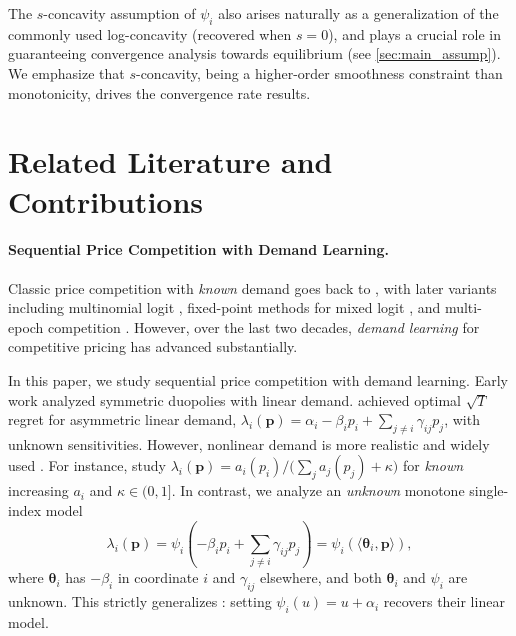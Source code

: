 \documentclass{article} %
\begin{document}
The $s$-concavity assumption of $\psi_i$ also arises naturally as a generalization of the commonly used log-concavity (recovered when $s=0$), and plays a crucial role in guaranteeing convergence analysis towards equilibrium (see \cref{sec:main_assump}). We emphasize that $s$-concavity, being a higher-order smoothness constraint than monotonicity, drives the convergence rate results.


\section{Related Literature and Contributions}\label{sec:Related-Literature}

\paragraph{Sequential Price Competition with Demand Learning.}

Classic price competition with \emph{known} demand goes back to \cite{cournot1838recherches, bertrand1883review}, with later variants including multinomial logit \citep{gallego2006price, aksoy2013price, gallego2014multiproduct}, fixed-point methods for mixed logit \citep{morrow2011fixed}, and multi-epoch competition \citep{gallego2014dynamic,federgruen2015multi, chen2021duopoly}. However, over the last two decades, \emph{demand learning} for competitive pricing has advanced substantially.

In this paper, we study sequential price competition with demand learning. Early work \citep{kirman1975learning} analyzed symmetric duopolies with linear demand. \cite{li2024lego} achieved optimal $\sqrt{T}$ regret for asymmetric linear demand, $\lambda_i(\mathbf p)=\alpha_i-\beta_i p_i+\sum_{j\ne i}\gamma_{ij}p_j$, with unknown sensitivities. However, nonlinear demand is more realistic and widely used \citep{gallego2006price, wan2022nonlinear, wan2023conditions}. For instance, \cite{gallego2006price} study $\lambda_i(\mathbf p)= a_i(p_i) / \big(\sum_j a_j(p_j)+\kappa\big)$ for \emph{known} increasing $a_i$ and $\kappa\in(0,1]$. In contrast, we analyze an \emph{unknown} monotone single-index model
\begin{equation}\label{eq:SIM}
\textstyle \lambda_i(\mathbf p)
=\psi_i(-\beta_i p_i+\sum_{j\ne i}\gamma_{ij}p_j)
=\psi_i\!\left(\langle\boldsymbol\theta_i,\mathbf p\rangle\right),
\end{equation}
where $\boldsymbol\theta_i$ has $-\beta_i$ in coordinate $i$ and $\gamma_{ij}$ elsewhere, and both $\boldsymbol\theta_i$ and $\psi_i$ are unknown. This strictly generalizes \cite{li2024lego}: setting $\psi_i(u)=u+\alpha_i$ recovers their linear model.
\end{document}
